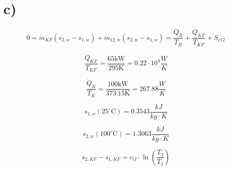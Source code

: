 

\section*{c)}

\[
0 = \dot{m}_{KF} \left( s_{2,w} - s_{1,w} \right) + \dot{m}_{12,w} \left( s_{2,w} - s_{1,w} \right) = \frac{\dot{Q}_R}{T_R} + \frac{\dot{Q}_{KF}}{T_{KF}} + S_{c12}
\]

\[
\frac{\dot{Q}_{KF}}{T_{KF}} = \frac{65 \text{kW}}{295 \text{K}} = 0.22 \cdot 10^3 \frac{W}{K}
\]

\[
\frac{\dot{Q}_R}{T_R} = \frac{100 \text{kW}}{373.15 \text{K}} = 267.88 \frac{W}{K}
\]

\[
s_{1,w} \left( 25^\circ \text{C} \right) = 0.3543 \frac{kJ}{kg \cdot K}
\]

\[
s_{2,w} \left( 100^\circ \text{C} \right) = 1.3063 \frac{kJ}{kg \cdot K}
\]

\[
s_{2, KF} - s_{1, KF} = c_{if} \cdot \ln \left( \frac{T_2}{T_1} \right)
\]